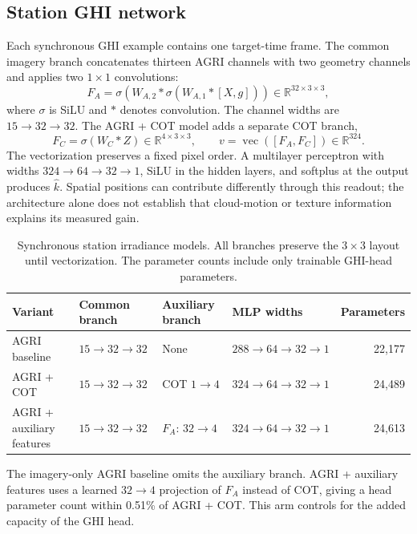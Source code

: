 \documentclass[11pt]{article}
\begin{document}
\subsection{Station GHI network}
Each synchronous GHI example contains one target-time frame. The common imagery branch concatenates thirteen AGRI channels with two geometry channels and applies two $1\times1$ convolutions:
\begin{equation}
F_A=\sigma\!\left(W_{A,2}*
\sigma\!\left(W_{A,1}*[X,g]\right)\right)
\in\mathbb R^{32\times3\times3},
\label{eq:agri-encoder}
\end{equation}
where $\sigma$ is SiLU and $*$ denotes convolution. The channel widths are $15\rightarrow32\rightarrow32$. The AGRI + COT model adds a separate COT branch,
\begin{equation}
F_C=\sigma(W_C*Z)\in\mathbb R^{4\times3\times3},
\qquad
v=\operatorname{vec}([F_A,F_C])\in\mathbb R^{324}.
\label{eq:cot-encoder}
\end{equation}
The vectorization preserves a fixed pixel order. A multilayer perceptron with widths $324\rightarrow64\rightarrow32\rightarrow1$, SiLU in the hidden layers, and softplus at the output produces $\widehat k$. Spatial positions can contribute differently through this readout; the architecture alone does not establish that cloud-motion or texture information explains its measured gain.

\begin{table}[!htbp]
\centering\small
\setlength{\tabcolsep}{4pt}
\caption{Synchronous station irradiance models. All branches preserve the $3\times3$ layout until vectorization. The parameter counts include only trainable GHI-head parameters.}
\label{tab:heads}
\begin{tabularx}{\linewidth}{Xlllr}
\toprule
Variant & Common branch & Auxiliary branch & MLP widths & Parameters\\
\midrule
AGRI baseline & $15\to32\to32$ & None & $288\to64\to32\to1$ & 22,177\\
AGRI + COT & $15\to32\to32$ & COT $1\to4$ & $324\to64\to32\to1$ & 24,489\\
AGRI + auxiliary features & $15\to32\to32$ & $F_A$: $32\to4$ & $324\to64\to32\to1$ & 24,613\\
\bottomrule
\end{tabularx}
\end{table}

The imagery-only AGRI baseline omits the auxiliary branch. AGRI + auxiliary features uses a learned $32\rightarrow4$ projection of $F_A$ instead of COT, giving a head parameter count within 0.51\% of AGRI + COT. This arm controls for the added capacity of the GHI head.
\end{document}
